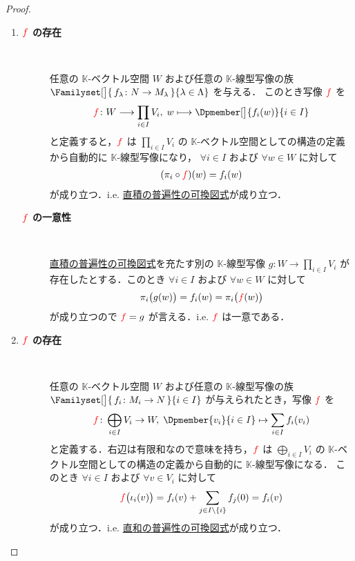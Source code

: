 \documentclass[rep_main]{subfiles}
\begin{document}
\begin{proof}
    \begin{enumerate}
		\item 
		\begin{description}
			\item[\textbf{$\textcolor{red}{f}$ の存在}]　
            
            任意の $\mathbb{K}$-ベクトル空間 $W$ および任意の $\mathbb{K}$-線型写像の族 $\Familyset[\big]{\, f_\lambda \colon N \to M_\lambda\,}{\lambda\in\Lambda}$ を与える．
            このとき写像 $\textcolor{red}{f}$ を
			\begin{align}
				\textcolor{red}{f} \colon W \lto \prod_{i\in I}V_i,\; w \lmto \Dpmember[\big]{f_i(w)}{i\in I}
			\end{align}
			と定義すると，$\textcolor{red}{f}$ は $\prod_{i\in I}V_i$ の $\mathbb{K}$-ベクトル空間としての構造の定義から自動的に $\mathbb{K}$-線型写像になり，
            $\forall i \in I$ および $\forall w \in W$ に対して
			\begin{align}
				(\pi_i \circ \textcolor{red}{f})(w) = f_i(w)
			\end{align}
			が成り立つ．i.e. \hyperref[def:univ-vec-sum]{直積の普遍性の可換図式}が成り立つ．
			\item[\textbf{$\textcolor{red}{f}$ の一意性}]　
            
            \hyperref[def:univ-vec-sum]{直積の普遍性の可換図式}を充たす別の $\mathbb{K}$-線型写像 $g \colon W \to \displaystyle \prod_{i\in I}V_i$ が存在したとする．このとき $\forall i \in I$ および $\forall w \in W$ に対して
			\begin{align}
				\pi_i \bigl( g(w) \bigr) = f_i(w) = \pi_i \bigl( \textcolor{red}{f}(w) \bigr) 
			\end{align}
			が成り立つので $\textcolor{red}{f} = g$ が言える．i.e. $\textcolor{red}{f}$ は一意である．
		\end{description}
		\item 
		\begin{description}
			\item[\textbf{$\textcolor{red}{f}$ の存在}]　
            
            任意の $\mathbb{K}$-ベクトル空間 $W$ および任意の $\mathbb{K}$-線型写像の族 $\Familyset[\big]{\, f_i \colon M_i \to N\,}{i \in I}$ が与えられたとき，写像 $\textcolor{red}{f}$ を
			\begin{align}
				\textcolor{red}{f} \colon \bigoplus_{i \in I} V_i \to W,\; \Dpmember{v_i}{i \in I} \mapsto \sum_{i \in I} f_i(v_i)
			\end{align}
			と定義する．右辺は有限和なので意味を持ち，$\textcolor{red}{f}$ は $\bigoplus_{i\in I}V_i$ の $\mathbb{K}$-ベクトル空間としての構造の定義から自動的に $\mathbb{K}$-線型写像になる．
            このとき $\forall i\in I$ および $\forall v \in V_i$ に対して
			\begin{align}
				\textcolor{red}{f} \bigl( \iota_i(v) \bigr) = f_i(v) + \sum_{j \in I \setminus \{i\}} f_j(0) = f_i(v)
			\end{align}
			が成り立つ．i.e. \hyperref[def:univ-vec-sum]{直和の普遍性の可換図式}が成り立つ．


\end{description}
\end{enumerate}
\end{proof}
\end{document}
